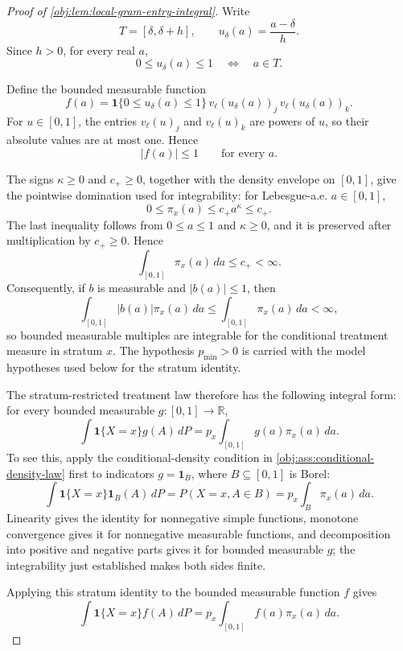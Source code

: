 \documentclass[11pt]{article}
\begin{document}
\begin{proof}[Proof of \cref{obj:lem:local-gram-entry-integral}]
Write
\[
T=[\delta,\delta+h],
\qquad
u_\delta(a)=\frac{a-\delta}{h}.
\]
Since \(h>0\), for every real \(a\),
\[
0\le u_\delta(a)\le1
\quad\Longleftrightarrow\quad
a\in T .
\] %

Define the bounded measurable function
\[
f(a)
=
\mathbf 1\{0\le u_\delta(a)\le1\}\,
v_\ell(u_\delta(a))_j\,v_\ell(u_\delta(a))_k .
\]
For \(u\in[0,1]\), the entries \(v_\ell(u)_j\) and \(v_\ell(u)_k\) are powers of
\(u\), so their absolute values are at most one. Hence
\[
|f(a)|\le1
\qquad\text{for every }a .
\] %

The signs \(\kappa\ge0\) and \(c_+\ge0\), together with the density envelope on
\([0,1]\), give the pointwise domination used for integrability: for
Lebesgue-a.e. \(a\in[0,1]\),
\[
0\le \pi_x(a)\le c_+a^\kappa\le c_+ .
\]
The last inequality follows from \(0\le a\le1\) and \(\kappa\ge0\), and it is
preserved after multiplication by \(c_+\ge0\). Hence
\[
\int_{[0,1]}\pi_x(a)\,da\le c_+<\infty .
\]
Consequently, if \(b\) is measurable and \(|b(a)|\le1\), then
\[
\int_{[0,1]} |b(a)|\pi_x(a)\,da
\le
\int_{[0,1]}\pi_x(a)\,da
<\infty,
\]
so bounded measurable multiples are integrable for the conditional treatment
measure in stratum \(x\). The hypothesis \(p_{\min}>0\) is carried with the
model hypotheses used below for the stratum identity. %

The stratum-restricted treatment law therefore has the following integral form:
for every bounded measurable \(g:[0,1]\to\mathbb R\),
\[
\int \mathbf 1\{X=x\}g(A)\,dP
=
p_x\int_{[0,1]}g(a)\pi_x(a)\,da .
\]
To see this, apply the conditional-density condition in
\cref{obj:ass:conditional-density-law} first to indicators
\(g=\mathbf 1_B\), where \(B\subseteq[0,1]\) is Borel:
\[
\int \mathbf 1\{X=x\}\mathbf 1_B(A)\,dP
=
P(X=x,A\in B)
=
p_x\int_B\pi_x(a)\,da .
\]
Linearity gives the identity for nonnegative simple functions, monotone
convergence gives it for nonnegative measurable functions, and decomposition
into positive and negative parts gives it for bounded measurable \(g\); the
integrability just established makes both sides finite. %

Applying this stratum identity to the bounded measurable function \(f\) gives
\[
\int \mathbf 1\{X=x\}f(A)\,dP
=
p_x\int_{[0,1]}f(a)\pi_x(a)\,da .
\] %


\end{proof}
\end{document}
